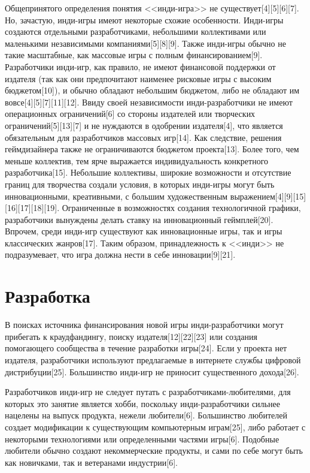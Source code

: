 Общепринятого определения понятия <<инди-игра>> не существует[4][5][6][7]. Но, зачастую, инди-игры имеют 
некоторые схожие особенности. Инди-игры создаются отдельными разработчиками, небольшими коллективами или 
маленькими независимыми компаниями[5][8][9]. Также инди-игры обычно не такие масштабные, как массовые игры 
с полным финансированием[9]. Разработчики инди-игр, как правило, не имеют финансовой поддержки от издателя 
(так как они предпочитают наименее рисковые игры с высоким бюджетом[10]), и обычно обладают небольшим 
бюджетом, либо не обладают им вовсе[4][5][7][11][12]. Ввиду своей независимости инди-разработчики не имеют 
операционных ограничений[6] со стороны издателей или творческих ограничений[5][13][7] и не нуждаются в 
одобрении издателя[4], что является обязательным для разработчиков массовых игр[14]. Как следствие, решения 
геймдизайнера также не ограничиваются бюджетом проекта[13]. Более того, чем меньше коллектив, тем ярче 
выражается индивидуальность конкретного разработчика[15]. Небольшие коллективы, широкие возможности и 
отсутствие границ для творчества создали условия, в которых инди-игры могут быть инновационными, 
креативными, с большим художественным выражением[4][9][15][16][17][18][19]. Ограниченные в возможностях 
создания технологичной графики, разработчики вынуждены делать ставку на инновационный геймплей[20]. Впрочем, 
среди инди-игр существуют как инновационные игры, так и игры классических жанров[17]. Таким образом, 
принадлежность к <<инди>> не подразумевает, что игра должна нести в себе инновации[9][21].

\section{Разработка}

В поисках источника финансирования новой игры инди-разработчики могут прибегать к краудфандингу, поиску 
издателя[12][22][23] или создания помогающего сообщества в течение разработки игры[24]. Если у проекта нет 
издателя, разработчики используют предлагаемые в интернете службы цифровой дистрибуции[25]. Большинство 
инди-игр не приносит существенного дохода[26].

Разработчиков инди-игр не следует путать с разработчиками-любителями, для которых это занятие является 
хобби, поскольку инди-разработчики сильнее нацелены на выпуск продукта, нежели любители[6]. Большинство 
любителей создает модификации к существующим компьютерным играм[25], либо работает с некоторыми технологиями 
или определенными частями игры[6]. Подобные любители обычно создают некоммерческие продукты, и сами по 
себе могут быть как новичками, так и ветеранами индустрии[6].

